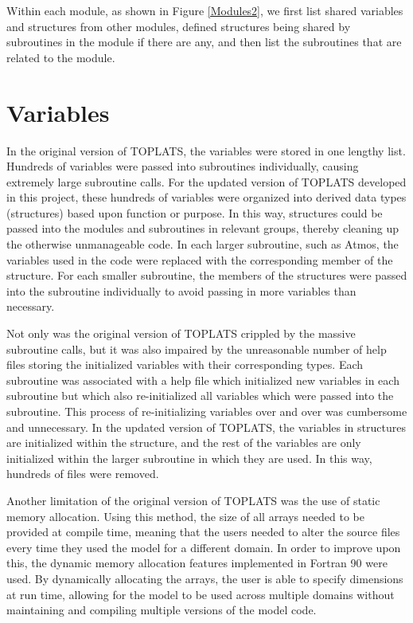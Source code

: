 \documentclass[pdftex,12pt,a4paper]{article}
\begin{document}
Within each module, as shown in Figure \ref{Modules2}, we first list shared variables and structures from other modules, defined structures being shared by subroutines in the module if there are any, and then list the subroutines that are related to the module. 

\section{Variables}
In the original version of TOPLATS, the variables were stored in one lengthy list. Hundreds of variables were passed into subroutines individually, causing extremely large subroutine calls. For the updated version of TOPLATS developed in this project, these hundreds of variables were organized into derived data types (structures) based upon function or purpose. In this way, structures could be passed into the modules and subroutines in relevant groups, thereby cleaning up the otherwise unmanageable code. In each larger subroutine, such as Atmos, the variables used in the code were replaced with the corresponding member of the structure. For each smaller subroutine, the members of the structures were passed into the subroutine individually to avoid passing in more variables than necessary.

\vspace{1em}

Not only was the original version of TOPLATS crippled by the massive subroutine calls, but it was also impaired by the unreasonable number of help files storing the initialized variables with their corresponding types. Each subroutine was associated with a help file which initialized new variables in each subroutine but which also re-initialized all variables which were passed into the subroutine. This process of re-initializing variables over and over was cumbersome and unnecessary. In the updated version of TOPLATS, the variables in structures are initialized within the structure, and the rest of the variables are only initialized within the larger subroutine in which they are used. In this way, hundreds of files were removed.

\vspace{1em}

Another limitation of the original version of TOPLATS was the use of static memory allocation. Using this method, the size of all arrays needed to be provided at compile time, meaning that the users needed to alter the source files every time they used the model for a different domain. In order to improve upon this, the dynamic memory allocation features implemented in Fortran 90 were used. By dynamically allocating the arrays, the user is able to specify dimensions at run time, allowing for the model to be used across multiple domains without maintaining and compiling multiple versions of the model code.
\end{document}
